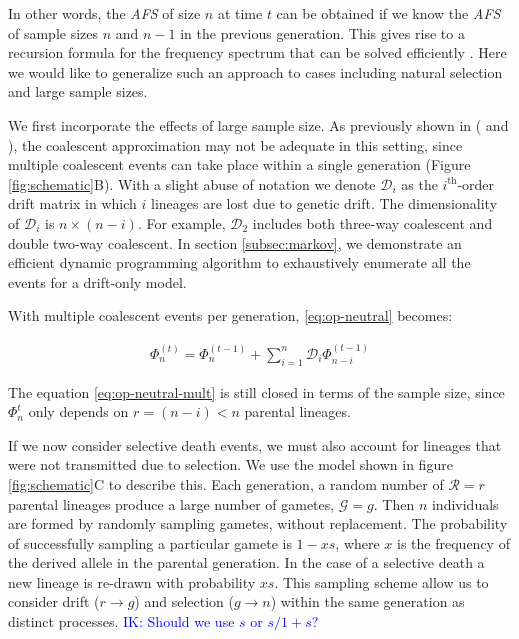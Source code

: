 \documentclass[review]{elsarticle}
\newcommand{\ra}{\rightarrow}
\newcommand{\ikcomment}[1]{\textcolor{blue}{IK: #1}}
\begin{document}
In other words, the \textit{AFS} of size $n$ at time $t$ can be obtained if we know the \textit{AFS}
of sample sizes $n$ and $n-1$ in the previous generation. This gives rise to a recursion formula for
the frequency spectrum that can be solved efficiently \citep{JouganousEtAl2017}. Here we would like
to generalize such an approach to cases including natural selection and large sample sizes.

We first incorporate the effects of large sample size. As previously shown in
(\cite{BhaskarEtAl2014} and \cite{NelsonEtAl2019}), the coalescent approximation may not be adequate in this
setting, since multiple coalescent events can take place within a single generation
(Figure \ref{fig:schematic}B). With a slight abuse of notation we denote $\mathcal{D}_i$ as the
$i^{\text{th}}$-order drift matrix in which $i$ lineages are lost due to genetic drift. The
dimensionality of $\mathcal{D}_i$ is $n \times (n-i)$. For example, $\mathcal{D}_2$ includes both
three-way coalescent and double two-way coalescent. In section \ref{subsec:markov}, we demonstrate an
efficient dynamic programming algorithm to exhaustively enumerate all the events for a drift-only
model.

With multiple coalescent events per generation, \eqref{eq:op-neutral} becomes:

\begin{align}
  \label{eq:op-neutral-mult}
  \Phi_{n}^{(t)}=\Phi_{n}^{(t-1)}+\sum_{i=1}^{n}\mathcal{D}_i \Phi_{n-i}^{(t-1)}
\end{align}

The equation \eqref{eq:op-neutral-mult} is still closed in terms of the sample size, since
$\Phi_{n}^{t}$ only depends on $r=(n-i)<n$ parental lineages. 


If we now consider selective death events, we must also account for lineages that were not
transmitted due to selection. We use the model shown in figure \ref{fig:schematic}C to describe
this. Each generation, a random number of $\mathcal{R}=r$ parental lineages produce a large number
of gametes, $\mathcal{G}=g$. Then $n$ individuals are formed by randomly sampling gametes, without
replacement. The probability of successfully sampling a particular gamete is $1-xs$, where $x$ is
the frequency of the derived allele in the parental generation. In the case of a selective death a
new lineage is re-drawn with probability $xs$. This sampling scheme allow us to consider drift ($r
\ra g$) and selection ($g \ra n$) within the same generation as distinct processes.
\ikcomment{Should we use $s$ or $s/1+s$?}
 
\end{document}
